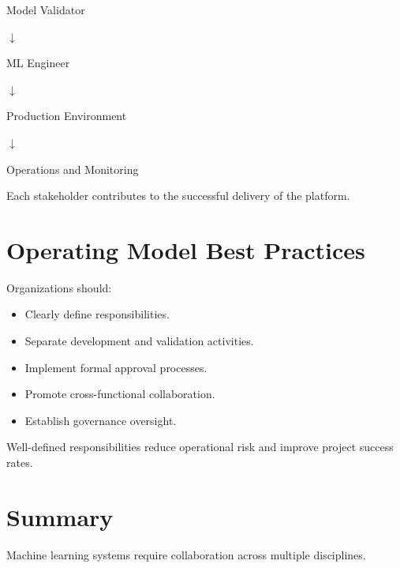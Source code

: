 \begin{center}
Model Validator
\end{center}

\begin{center}
$\downarrow$
\end{center}

\begin{center}
ML Engineer
\end{center}

\begin{center}
$\downarrow$
\end{center}

\begin{center}
Production Environment
\end{center}

\begin{center}
$\downarrow$
\end{center}

\begin{center}
Operations and Monitoring
\end{center}

Each stakeholder contributes to the successful delivery of the platform.

\section{Operating Model Best Practices}

Organizations should:

\begin{itemize}
    \item Clearly define responsibilities.
    \item Separate development and validation activities.
    \item Implement formal approval processes.
    \item Promote cross-functional collaboration.
    \item Establish governance oversight.
\end{itemize}

Well-defined responsibilities reduce operational risk and improve project success rates.

\section{Summary}

Machine learning systems require collaboration across multiple disciplines.

